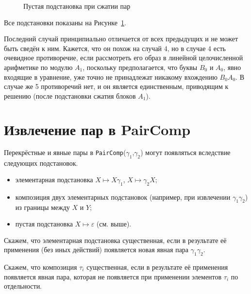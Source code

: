 \documentclass[12pt]{article}
\begin{document}
\begin{figure}[!htb]
{
}
\caption{Пустая подстановка при сжатии пар}
\label{fig::test1}
\end{figure}

Все подстановки показаны на Рисунке~\ref{fig::test1}.

Последний случай принципиально отличается от всех предыдущих и не может быть сведён к ним. Кажется, что он похож на случай 4, но в случае 4 есть очевидное противоречие, если рассмотреть его образ в линейной целочисленной арифметике по модулю $A_1$, поскольку предполагается, что буквы $B_0$ и $A_0$, явно входящие в уравнение, уже точно не принадлежат никакому вхождению $B_0 A_0$. В случае же 5 противоречий нет, и он является единственным, приводящим к решению (после подстановки сжатия блоков $A_1$). 

\section{Извлечение пар в PairComp}

Перекрёстные и явные пары в \verb|PairComp|($\gamma_1$,$\gamma_2$) могут появляться вследствие следующих подстановок.
\begin{itemize}
\item элементарная подстановка $X\mapsto X\gamma_1$, $X\mapsto \gamma_2 X$;
\item композиция двух элементарных подстановок (например, при извлечении $\gamma_1\gamma_2$) из границы между $X$ и $Y$;
\item пустая подстановка $X\mapsto \varepsilon$ (см. выше).
\end{itemize}
 
Скажем, что элементарная подстановка существенная, если в результате её применения (без иных действий) появляется новая явная пара $\gamma_1\gamma_2$. 
 
Скажем, что композиция $\tau_i$ существенная, если в результате её применения появляется явная пара, которая не появляется при применении элементов $\tau_i$ по отдельности.
\end{document}
